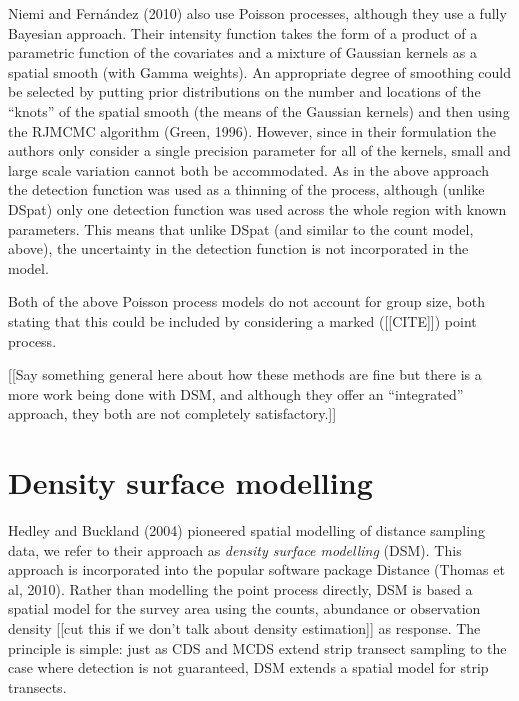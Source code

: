 \documentclass[useAMS,referee]{biom}
\begin{document}
Niemi and Fern\'andez (2010) also use Poisson processes, although they use a fully Bayesian approach. Their intensity function takes the form of a product of a parametric function of the covariates and a mixture of Gaussian kernels as a spatial smooth (with Gamma weights). An appropriate degree of smoothing could be selected by putting prior distributions on the number and locations of the ``knots'' of the spatial smooth (the means of the Gaussian kernels) and then using the RJMCMC algorithm (Green, 1996). However, since in their formulation the authors only consider a single precision parameter for all of the kernels, small and large scale variation cannot both be accommodated. As in the above approach the detection function was used as a thinning of the process, although (unlike DSpat) only one detection function was used across the whole region with known parameters. This means that unlike DSpat (and similar to the count model, above), the uncertainty in the detection function is not incorporated in the model.

Both of the above Poisson process models do not account for group size, both stating that this could be included by considering a marked ([[CITE]]) point process.

[[Say something general here about how these methods are fine but there is a more work being done with DSM, and although they offer an ``integrated'' approach, they both are not completely satisfactory.]]

\section{Density surface modelling}
\label{s:dsm}

Hedley and Buckland (2004) pioneered spatial modelling of distance sampling data, we refer to their approach as \textit{density surface modelling} (DSM). This approach is incorporated into the popular software package Distance (Thomas et al, 2010). Rather than modelling the point process directly, DSM is based a spatial model for the survey area using the counts, abundance or observation density [[cut this if we don't talk about density estimation]] as response. The principle is simple: just as CDS and MCDS extend strip transect sampling to the case where detection is not guaranteed, DSM extends a spatial model for strip transects.
\end{document}
